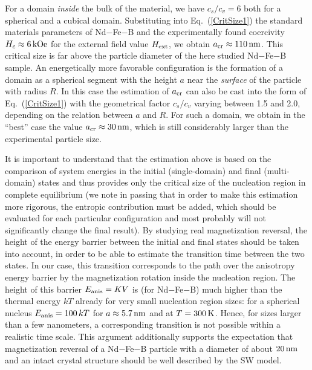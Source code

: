 \documentclass[prm,twocolumn,showkeys,preprintnumbers,amsmath,amssymb,superscriptaddress,aps,10pt]{revtex4-1}
\begin{document}
For a domain {\it inside} the bulk of the material, we have $c_s/c_v = 6$ both for a spherical and a cubical domain. Substituting into Eq.~(\ref{CritSize1}) the standard materials parameters of Nd$-$Fe$-$B and the experimentally found coercivity $H_c \approx 6 \, {\rm kOe}$ for the external field value $H_{\rm ext}$, we obtain $a_{\rm cr} \approx 110 \, {\rm nm}$. This critical size is far above the particle diameter of the here studied Nd$-$Fe$-$B sample. An energetically more favorable configuration is the formation of a domain as a spherical segment with the height $a$ near the {\it surface} of the particle with radius $R$. In this case the estimation of $a_{\rm cr}$ can also be cast into the form of Eq.~(\ref{CritSize1}) with the geometrical factor $c_s/c_v$ varying between 1.5 and 2.0, depending on the relation between $a$ and $R$. For such a domain, we obtain in the ``best'' case the value $a_{\rm cr} \approx 30 \, {\rm nm}$, which is still considerably larger than the experimental particle size.

It is important to understand that the estimation above is based on the comparison of system energies in the initial (single-domain) and final (multi-domain) states and thus provides only the critical size of the nucleation region in complete equilibrium (we note in passing that in order to make this estimation more rigorous, the entropic contribution must be added, which should be evaluated for each particular configuration and most probably will not significantly change the final result). By studying real magnetization reversal, the height of the energy barrier between the initial and final states should be taken into account, in order to be able to estimate the transition time between the two states. In our case, this transition corresponds to the path over the anisotropy energy barrier by the magnetization rotation inside the nucleation region. The height of this barrier $E_{\rm anis} = K V$ is (for Nd$-$Fe$-$B) much higher than the thermal energy $k T$ already for very small nucleation region sizes: for a spherical nucleus $E_{\rm anis} = 100 \, k T$ for $a \approx 5.7 \, {\rm nm}$ and at $T = 300 \, \rm K$. Hence, for sizes larger than a few nanometers, a corresponding transition is not possible within a realistic time scale. This argument additionally supports the expectation that magnetization reversal of a Nd$-$Fe$-$B particle with a diameter of about $20 \, {\rm nm}$ and an intact crystal structure should be well described by the SW model. 
\end{document}
